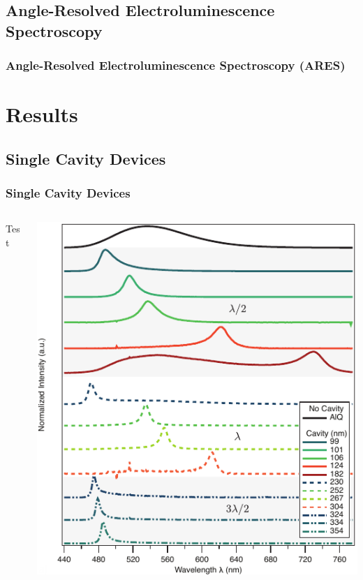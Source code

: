 \documentclass{beamer}
\begin{document}
    \subsection{Angle-Resolved Electroluminescence Spectroscopy}
		\begin{frame}
			\frametitle{Angle-Resolved Electroluminescence Spectroscopy (ARES)}
		\end{frame}
    
\section{Results}
    \frame{\tableofcontents[currentsection]}
    
    \subsection{Single Cavity Devices}
        \begin{frame}
            \frametitle{Single Cavity Devices}
            \begin{columns}
                \begin{column}{0.4\textwidth}
					Test
                \end{column}
                \begin{column}{0.6\textwidth}
					\centering
					\includegraphics[width=\textwidth]{images/n1_spectra.png}
                \end{column}
            \end{columns}
        \end{frame}
        
\end{document}
